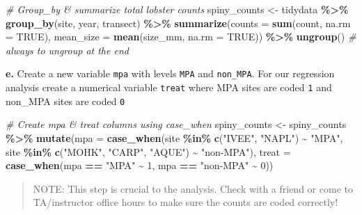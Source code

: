 \documentclass[
]{article}
\newenvironment{Shaded}{\begin{snugshade}}{\end{snugshade}}
\newcommand{\AttributeTok}[1]{\textcolor[rgb]{0.13,0.29,0.53}{#1}}
\newcommand{\CommentTok}[1]{\textcolor[rgb]{0.56,0.35,0.01}{\textit{#1}}}
\newcommand{\ConstantTok}[1]{\textcolor[rgb]{0.56,0.35,0.01}{#1}}
\newcommand{\DecValTok}[1]{\textcolor[rgb]{0.00,0.00,0.81}{#1}}
\newcommand{\FunctionTok}[1]{\textcolor[rgb]{0.13,0.29,0.53}{\textbf{#1}}}
\newcommand{\NormalTok}[1]{#1}
\newcommand{\OtherTok}[1]{\textcolor[rgb]{0.56,0.35,0.01}{#1}}
\newcommand{\SpecialCharTok}[1]{\textcolor[rgb]{0.81,0.36,0.00}{\textbf{#1}}}
\newcommand{\StringTok}[1]{\textcolor[rgb]{0.31,0.60,0.02}{#1}}
\begin{document}
\begin{Shaded}
\begin{Highlighting}[]
\CommentTok{\# Group\_by \& summarize total lobster counts}
\NormalTok{spiny\_counts }\OtherTok{\textless{}{-}}\NormalTok{ tidydata }\SpecialCharTok{\%\textgreater{}\%} 
    \FunctionTok{group\_by}\NormalTok{(site, year, transect) }\SpecialCharTok{\%\textgreater{}\%} 
    \FunctionTok{summarize}\NormalTok{(}\AttributeTok{counts =} \FunctionTok{sum}\NormalTok{(count, }\AttributeTok{na.rm =} \ConstantTok{TRUE}\NormalTok{),}
              \AttributeTok{mean\_size =} \FunctionTok{mean}\NormalTok{(size\_mm, }\AttributeTok{na.rm =} \ConstantTok{TRUE}\NormalTok{)) }\SpecialCharTok{\%\textgreater{}\%} 
    \FunctionTok{ungroup}\NormalTok{() }\CommentTok{\# always to ungroup at the end }
\end{Highlighting}
\end{Shaded}

\textbf{e.} Create a new variable \texttt{mpa} with levels \texttt{MPA}
and \texttt{non\_MPA}. For our regression analysis create a numerical
variable \texttt{treat} where MPA sites are coded \texttt{1} and
non\_MPA sites are coded \texttt{0}

\begin{Shaded}
\begin{Highlighting}[]
\CommentTok{\# Create mpa \& treat columns using case\_when }
\NormalTok{spiny\_counts }\OtherTok{\textless{}{-}}\NormalTok{ spiny\_counts }\SpecialCharTok{\%\textgreater{}\%} 
    \FunctionTok{mutate}\NormalTok{(}\AttributeTok{mpa =} \FunctionTok{case\_when}\NormalTok{(site }\SpecialCharTok{\%in\%} \FunctionTok{c}\NormalTok{(}\StringTok{"IVEE"}\NormalTok{, }\StringTok{"NAPL"}\NormalTok{) }\SpecialCharTok{\textasciitilde{}} \StringTok{"MPA"}\NormalTok{,}
\NormalTok{                           site }\SpecialCharTok{\%in\%} \FunctionTok{c}\NormalTok{(}\StringTok{"MOHK"}\NormalTok{, }\StringTok{"CARP"}\NormalTok{, }\StringTok{"AQUE"}\NormalTok{) }\SpecialCharTok{\textasciitilde{}} \StringTok{"non{-}MPA"}\NormalTok{),}
           \AttributeTok{treat =} \FunctionTok{case\_when}\NormalTok{(mpa }\SpecialCharTok{==} \StringTok{"MPA"} \SpecialCharTok{\textasciitilde{}} \DecValTok{1}\NormalTok{,}
\NormalTok{                             mpa }\SpecialCharTok{==} \StringTok{"non{-}MPA"} \SpecialCharTok{\textasciitilde{}} \DecValTok{0}\NormalTok{))}
\end{Highlighting}
\end{Shaded}

\begin{quote}
NOTE: This step is crucial to the analysis. Check with a friend or come
to TA/instructor office hours to make sure the counts are coded
correctly!
\end{quote}
\end{document}

